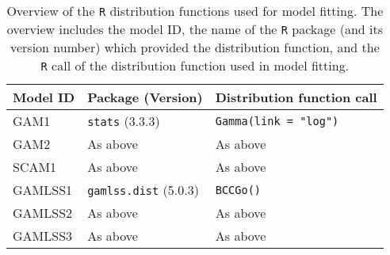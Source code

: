 \begin{table}[H]
  {\tabulinesep=2mm
    \begin{longtabu}{L l l}
      \caption{Overview of the \texttt{R} distribution functions used for model fitting.  The overview includes
        the model ID,
        the name of the \texttt{R} package (and its version number) which provided the distribution function,
        and the \texttt{R} call of the distribution function used in model fitting.
        \label{tab:PresentedModelsOverviewDistributions}} \\
      \toprule
      Model ID & Package (Version) & Distribution function call \\
      \midrule
      \endhead
      \bottomrule
      \endlastfoot
      GAM1 & \texttt{stats} (3.3.3) & \texttt{Gamma(link = "log")} \\
      GAM2 & As above & As above \\
      SCAM1 & As above & As above \\
      GAMLSS1 & \texttt{gamlss.dist} (5.0.3) & \texttt{BCCGo()} \\
      GAMLSS2 & As above & As above \\
      GAMLSS3 & As above & As above \\
      \bottomrule
    \end{longtabu}}
\end{table}

